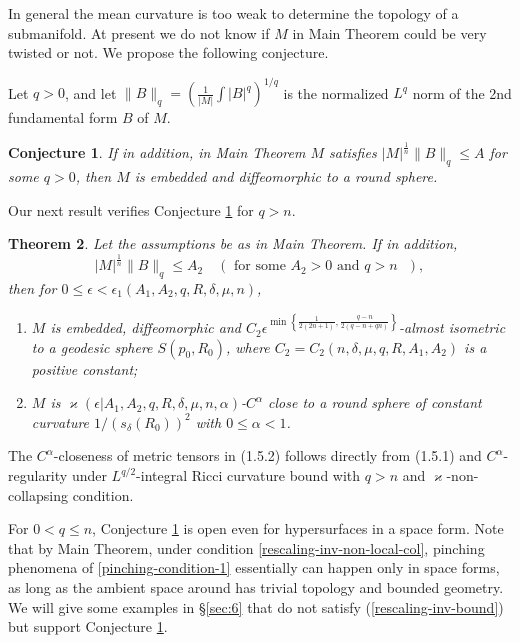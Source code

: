 \documentclass{amsart}
\numberwithin{equation}{section}
\newtheorem{theo}{Theorem}[section]
\newtheorem{conjecture}[theo]{Conjecture}
\theoremstyle{remark}
\renewcommand{\(}{\left(}
\renewcommand{\)}{\right)}
\renewcommand{\~}{\tilde}
\renewcommand{\-}{\overline}
\renewcommand{\d}{\delta}
\newcommand{\e}{\epsilon}
\begin{document}
In general the mean curvature is too weak to determine the topology of a submanifold. At present we do not know if $M$ in Main Theorem could be very twisted or not. We propose the following conjecture.

Let $q>0$, and let $\|B\|_q=\left(\frac{1}{|M|}\int |B|^q\right)^{1/q}$ is the normalized $L^q$ norm of the 2nd fundamental form $B$ of $M$. 
\begin{conjecture}\label{conj-main}
	If in addition, in Main Theorem $M$ satisfies $|M|^\frac{1}{n}\|B\|_q\leq A$ for some $q>0$, then $M$ is embedded and diffeomorphic to a round sphere.
\end{conjecture}

Our next result verifies Conjecture \ref{conj-main} for $q>n$.

\begin{theo}\label{main-theo-B}
	Let the assumptions be as in Main Theorem. If in addition, 
	\begin{equation}\label{rescaling-inv-bound}
	|M|^\frac{1}{n}\|B\|_q\leq A_2 \quad(\text{ for some $A_2>0$ and $q>n$ }),
	\end{equation}
	then for $0\le \e<\e_1(A_1,A_2, q,R,\d,\mu,n)$,
	\begin{enumerate}
		\item $M$ is embedded, diffeomorphic and $C_2\e^{\min\left\{ \frac{1}{2(2n+1)},\frac{q-n}{2(q-n+qn)}\right\}}$-almost isometric to a geodesic sphere $S(p_0,R_0)$, where $C_2=C_2(n,\d,\mu, q, R,A_1,A_2)$ is a positive constant;
		\item $M$ is  $\varkappa(\epsilon|A_1,A_2, q,R,\d,\mu,n,\alpha)$-$C^{\alpha}$ close to a round sphere of constant curvature $1/(s_\d(R_0))^2$ with $0\le\alpha<1$.
	\end{enumerate}
\end{theo}

The $C^{\alpha}$-closeness of metric tensors in (1.5.2) follows directly from (1.5.1) and  $C^{\alpha}$-regularity \cite[Theorem 2.35]{Tian-Zhang2016} under $L^{q/2}$-integral Ricci curvature bound with $q>n$ and $\varkappa$-non-collapsing condition.

For $0<q\le n$, Conjecture \ref{conj-main} is open even for hypersurfaces in a space form. Note that by Main Theorem, under condition \eqref{rescaling-inv-non-local-col}, pinching phenomena of \eqref{pinching-condition-1} essentially can happen only in space forms, as long as the ambient space around has trivial topology and bounded geometry. We will give some examples in \S \ref{sec:6} that do not satisfy (\ref{rescaling-inv-bound}) but support Conjecture \ref{conj-main}.
\end{document}
